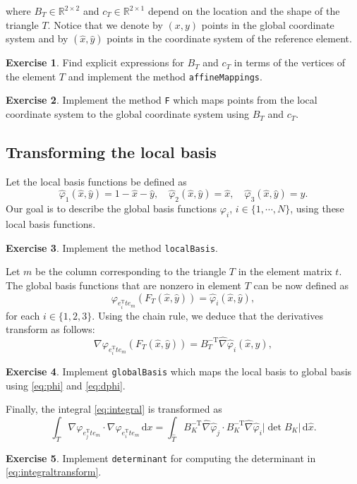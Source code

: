 \documentclass{amsart}
\theoremstyle{definition}
\newtheorem{exercise}{\color{red}Exercise}
\begin{document}
where $B_T \in \mathbb{R}^{2 \times 2}$ and $c_T \in \mathbb{R}^{2 \times 1}$
depend on the location and the shape of the triangle $T$.
Notice that we denote by $(x,y)$ points in the global
coordinate system and by $(\widehat{x},\widehat{y})$ points in the
coordinate system of the reference element.
\begin{exercise}
  Find explicit expressions for $B_T$ and $c_T$ in terms of the
vertices of the element $T$ and implement the method \verb|affineMappings|.
\end{exercise}
\begin{exercise}
  Implement the method \verb|F| which maps points from the local coordinate
  system to the global coordinate system using $B_T$ and $c_T$.
\end{exercise}
\subsection{Transforming the local basis}
Let the local basis functions be defined as
\begin{equation}
  \widehat{\varphi}_1(\widehat{x},\widehat{y}) = 1 - \widehat{x} - \widehat{y}, \quad \widehat{\varphi}_2(\widehat{x},\widehat{y}) = \widehat{x}, \quad \widehat{\varphi}_3(\widehat{x},\widehat{y}) = \widehat{y}.
\end{equation}
Our goal is to describe the global basis functions $\varphi_i$,
$i\in\{1,\cdots,N\}$, using these local basis functions.
\begin{exercise}
  Implement the method \verb|localBasis|.
\end{exercise}
Let $m$ be the column corresponding to the triangle $T$ in the element
matrix $t$. The global basis functions that are nonzero in element $T$
can be now defined as
\begin{equation}
  \label{eq:phi}
  \varphi_{e_i^{\mathrm{T}}te_m}(F_T(\widehat{x},\widehat{y}))= \widehat{\varphi}_i(\widehat{x},\widehat{y}),
\end{equation}
for each $i \in \{1,2,3\}$. Using the chain rule, we deduce that the
derivatives transform as follows:
\begin{equation}
  \label{eq:dphi}
  \nabla \varphi_{e_i^{\mathrm{T}}te_m}(F_T(\widehat{x},\widehat{y})) = B_T^{-\mathrm{T}} \widehat{\nabla} \widehat{\varphi}_i(\widehat{x},\widehat{y}),
\end{equation}
\begin{exercise}
  Implement \verb|globalBasis| which maps the local basis to global
basis using \eqref{eq:phi} and \eqref{eq:dphi}.
\end{exercise}
Finally, the integral \eqref{eq:integral} is transformed as
\begin{equation}
  \label{eq:integraltransform}
    \int_T \nabla \varphi_{e_j^{\mathrm{T}}te_m} \cdot \nabla \varphi_{e_i^{\mathrm{T}}te_m}\,\mathrm{d}x = \int_{\widehat{T}} B_K^{-\mathrm{T}}\widehat{\nabla} \widehat{\varphi}_j \cdot B_K^{-\mathrm{T}}\widehat{\nabla}\widehat{\varphi}_i|\det B_K|\,\mathrm{d}\widehat{x}.
\end{equation}
\begin{exercise}
  Implement \verb|determinant| for computing the determinant in \eqref{eq:integraltransform}.
\end{exercise}
\end{document}
